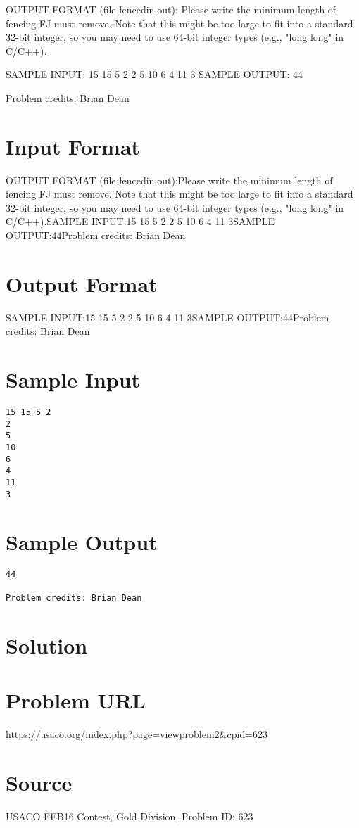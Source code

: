 \documentclass[12pt]{article}
\begin{document}
OUTPUT FORMAT (file fencedin.out):
Please write the minimum length of fencing FJ must remove.  Note that this might
be too large to fit into a standard 32-bit integer, so you may need to
use 64-bit integer types (e.g., "long long" in C/C++).

SAMPLE INPUT:
15 15 5 2
2
5
10
6
4
11
3
SAMPLE OUTPUT: 
44

Problem credits: Brian Dean



\section*{Input Format}
OUTPUT FORMAT (file fencedin.out):Please write the minimum length of fencing FJ must remove.  Note that this might
be too large to fit into a standard 32-bit integer, so you may need to
use 64-bit integer types (e.g., "long long" in C/C++).SAMPLE INPUT:15 15 5 2
2
5
10
6
4
11
3SAMPLE OUTPUT:44Problem credits: Brian Dean

\section*{Output Format}
SAMPLE INPUT:15 15 5 2
2
5
10
6
4
11
3SAMPLE OUTPUT:44Problem credits: Brian Dean

\section*{Sample Input}
\begin{verbatim}
15 15 5 2
2
5
10
6
4
11
3
\end{verbatim}

\section*{Sample Output}
\begin{verbatim}
44

Problem credits: Brian Dean
\end{verbatim}

\section*{Solution}


\section*{Problem URL}
https://usaco.org/index.php?page=viewproblem2&cpid=623

\section*{Source}
USACO FEB16 Contest, Gold Division, Problem ID: 623
\end{document}
